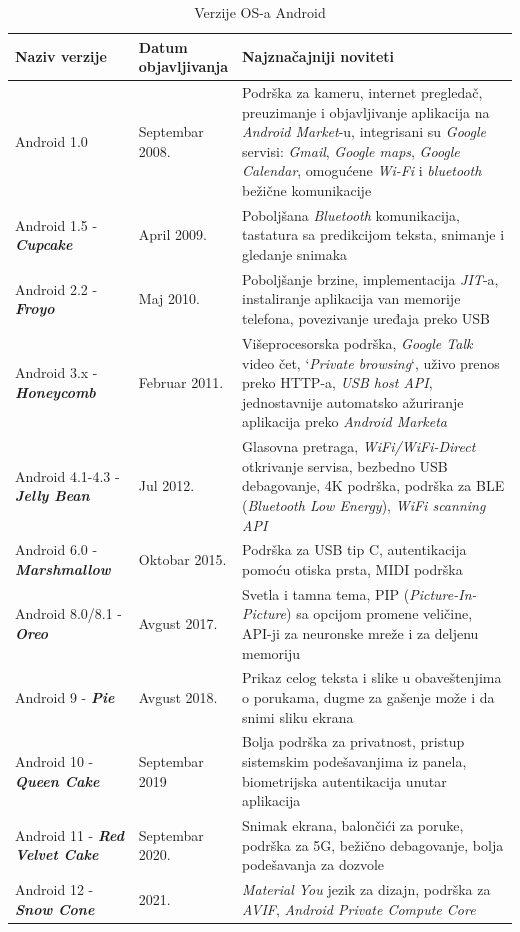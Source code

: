 \documentclass[android.tex]{subfiles}
\begin{document}
\begin{table}
\centering
\caption{Verzije OS-a Android}
\label{tbl:andrVerzije}
\begin{tabular}{p{0.25\linewidth} | p{0.15\linewidth}p{0.6\linewidth}}
\toprule
Naziv verzije & Datum objavljivanja & Najznačajniji noviteti \\
\toprule
Android 1.0 & Septembar 2008. & Podrška za kameru, internet pregledač, preuzimanje i objavljivanje aplikacija na \textit{Android Market}-u, integrisani su \textit{Google} servisi: \textit{Gmail}, \textit{Google maps}, \textit{Google Calendar}, omogućene \textit{Wi-Fi} i \textit{bluetooth} bežične komunikacije\\\midrule
Android 1.5 - \textbf{\textit{Cupcake}} & April 2009. & Poboljšana \textit{Bluetooth} komunikacija, tastatura sa predikcijom teksta, snimanje i gledanje snimaka\\\midrule
Android 2.2 - \textbf{\textit{Froyo}} & Maj 2010. & Poboljšanje brzine, implementacija \textit{JIT}-a, instaliranje aplikacija van memorije telefona, povezivanje uređaja preko USB \\\midrule
Android 3.x - \textbf{\textit{Honeycomb}} & Februar 2011. & Višeprocesorska podrška, \textit{Google Talk} video čet, `\textit{Private browsing}`, uživo prenos preko HTTP-a, \textit{USB host API}, jednostavnije automatsko ažuriranje aplikacija preko \textit{Android Marketa}\\\midrule
Android 4.1-4.3 - \textbf{\textit{Jelly Bean}} & Jul 2012. & Glasovna pretraga, \textit{WiFi/WiFi-Direct} otkrivanje servisa, bezbedno USB debagovanje, 4K podrška, podrška za BLE (\textit{Bluetooth Low Energy}), \textit{WiFi scanning API}\\\midrule
Android 6.0 - \textbf{\textit{Marshmallow}} & Oktobar 2015. & Podrška za USB tip C, autentikacija pomoću otiska prsta, MIDI podrška\\\midrule
Android 8.0/8.1 - \textbf{\textit{Oreo}} & Avgust 2017. & Svetla i tamna tema, PIP (\textit{Picture-In-Picture}) sa opcijom promene veličine, API-ji za neuronske mreže i za deljenu memoriju\\\midrule
Android 9 - \textbf{\textit{Pie}} & Avgust 2018. & Prikaz celog teksta i slike u obaveštenjima o porukama, dugme za gašenje može i da snimi sliku ekrana\\\midrule
Android 10 - \textbf{\textit{Queen Cake}} & Septembar 2019 & Bolja podrška za privatnost, pristup sistemskim podešavanjima iz panela, biometrijska autentikacija unutar aplikacija\\\midrule
Android 11 - \textbf{\textit{Red Velvet Cake}} & Septembar 2020. & Snimak ekrana, balončići za poruke, podrška za 5G, bežično debagovanje, bolja podešavanja za dozvole\\\midrule
Android 12 - \textbf{\textit{Snow Cone}} & 2021. & \textit{Material You }jezik za dizajn, podrška za \textit{AVIF}, \textit{Android Private Compute Core}\\
\bottomrule
\end{tabular}
\end{table}
\end{document}
